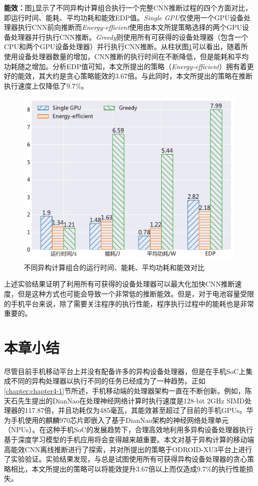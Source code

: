 \textbf{能效：}图\ref{figure:figure35}显示了不同异构计算组合执行一个完整CNN推断过程的四个方面对比，即运行时间、能耗、平均功耗和能效EDP值。\emph{Single GPU}仅使用一个GPU设备处理器执行CNN前向推断而\emph{Energy-efficient}使用由本文所提策略选择的两个GPU设备处理器并行执行CNN推断。\emph{Greedy}则使用所有可获得的设备处理器（包含一个CPU和两个GPU设备处理器）并行执行CNN推断。从柱状图\ref{figure:figure35}可以看出，随着所使用设备处理器数量的增加，CNN推断的执行时间在不断降低，但是能耗和平均功耗随之增加。分析EDP值可知，本文所提出的策略（\emph{Energy-efficient}）拥有着更好的能效，其大约是贪心策略能效的3.67倍。与此同时，本文所提出的策略在推断执行速度上仅降低了9.7\%。

\begin{figure}[htbp]
    \centering
    \includegraphics[height=0.4\textwidth]{figures/hc_gpu.pdf}
    \caption{不同异构计算组合的运行时间、能耗、平均功耗和能效对比}\label{figure:figure35}
\end{figure}

上述实验结果证明了利用所有可获得的设备处理器可以最大化加快CNN推断速度，但是这种方式也可能会导致一个非常低的推断能效。但是，对于电池容量受限的手机平台来说，除了需要关注程序的执行性能，程序执行过程中的能耗也是非常重要的\cite{brooks2000power}。

\section{本章小结}

尽管目前手机移动平台上并没有配备许多的异构设备处理器，但是在手机SoC上集成不同的异构处理器以执行不同的任务已经成为了一种趋势。正如\ref{chapter:chapter4-1}节所述，手机移动端的处理器架构一直在不断创新。例如，陈天石先生提出的DianNao在处理神经网络计算时执行速度是128-bit 2GHz SIMD处理器的117.87倍，并且功耗仅为485毫瓦\cite{chen2014diannao}，其能效甚至超过了目前的手机GPUs。华为手机使用的麒麟970芯片即嵌入了基于DianNao架构的神经网络处理单元（NPUs）。在这种手机SoC的发展趋势下，合理高效地利用多异构设备处理器执行基于深度学习模型的手机应用将会变得越来越重要。本文对基于异构计算的移动端高能效CNN离线推断进行了探索，并对所提出的策略于ODROID-XU3平台上进行了实验验证。实验结果发现，与总是试图使用所有可获得异构设备处理器的贪心策略相比，本文所提出的策略可以将能效提升3.67倍以上而仅造成9.7\%的执行性能损失。

\cleardoublepage 